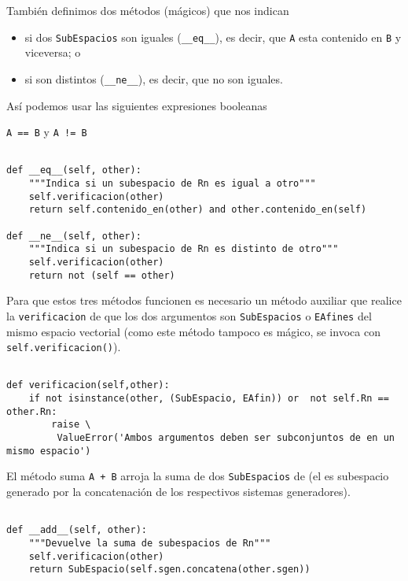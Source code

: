 \documentclass[11pt]{report}
\begin{document}
También definimos dos métodos (mágicos) que nos indican
\begin{itemize}
\item si dos \texttt{SubEspacios} son iguales (\texttt{\_\_eq\_\_}), es decir, que \texttt{A} esta
contenido en \texttt{B} y viceversa; o
\item si son distintos (\texttt{\_\_ne\_\_}), es decir, que no son iguales.
\end{itemize}

Así podemos usar las siguientes expresiones booleanas
\begin{center}
\Verb/A == B/
\quad y \quad
\Verb/A != B/
\end{center}


\begin{verbatim}

def __eq__(self, other):
    """Indica si un subespacio de Rn es igual a otro"""
    self.verificacion(other)
    return self.contenido_en(other) and other.contenido_en(self)

def __ne__(self, other):
    """Indica si un subespacio de Rn es distinto de otro"""
    self.verificacion(other)
    return not (self == other)

\end{verbatim}

Para que estos tres métodos funcionen es necesario un método auxiliar
que realice la \texttt{verificacion} de que los dos argumentos son
\texttt{SubEspacios} o \texttt{EAfines} del mismo espacio vectorial \R[m] (como este
método tampoco es mágico, se invoca con \texttt{self.verificacion()}).


\begin{verbatim}

def verificacion(self,other):
    if not isinstance(other, (SubEspacio, EAfin)) or  not self.Rn == other.Rn: 
        raise \
         ValueError('Ambos argumentos deben ser subconjuntos de en un mismo espacio')

\end{verbatim}

El método suma \texttt{A + B} arroja la suma de dos \texttt{SubEspacios} de \R[m]
(el es subespacio generado por la concatenación de los respectivos
sistemas generadores).


\begin{verbatim}

def __add__(self, other):
    """Devuelve la suma de subespacios de Rn"""
    self.verificacion(other)
    return SubEspacio(self.sgen.concatena(other.sgen))

\end{verbatim}
\end{document}
